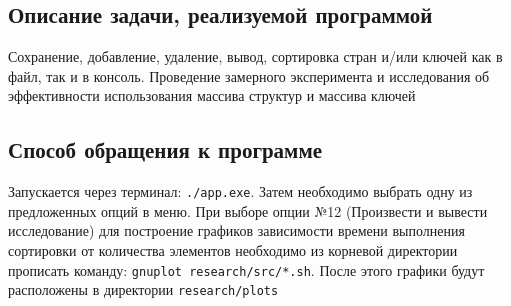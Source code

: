 \subsection{Описание задачи, реализуемой программой}
	Сохранение, добавление, удаление, вывод, сортировка стран и/или ключей как в файл, так и в консоль. Проведение замерного эксперимента и исследования об эффективности использования массива структур и массива ключей

\subsection{Способ обращения к программе}
	Запускается через терминал: \texttt{./app.exe}. Затем необходимо выбрать одну из предложенных опций в меню. При выборе опции №12 (Произвести и вывести исследование) для построение графиков зависимости времени выполнения сортировки от количества элементов необходимо из корневой директории прописать команду: \texttt{gnuplot research/src/*.sh}. После этого графики будут расположены в директории \texttt{research/plots}

